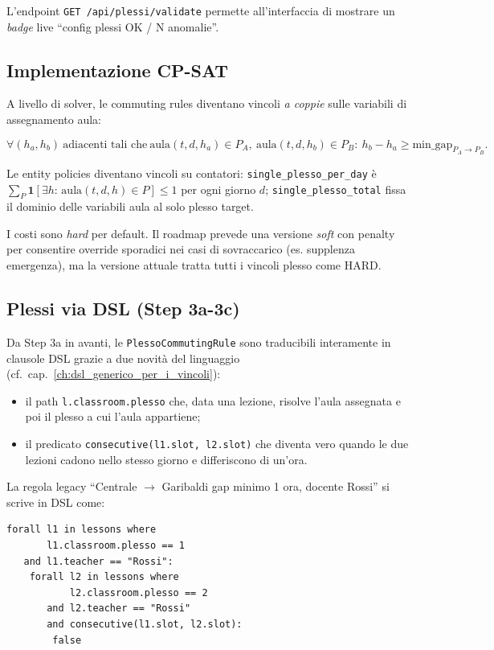 L'endpoint \texttt{GET /api/plessi/validate} permette
all'interfaccia di mostrare un \emph{badge} live ``config
plessi OK / N anomalie''.

\subsection{Implementazione CP-SAT}

A livello di solver, le commuting rules diventano vincoli
\emph{a coppie} sulle variabili di assegnamento aula:

\[
\forall (h_a, h_b)\ \text{adiacenti tali che}\
\text{aula}(t, d, h_a) \in P_A,\
\text{aula}(t, d, h_b) \in P_B:\
h_b - h_a \geq \text{min\_gap}_{P_A \to P_B}.
\]

Le entity policies diventano vincoli su contatori:
\texttt{single\_plesso\_per\_day} \`e
$\sum_{P} \mathbf{1}[\exists h:\,\text{aula}(t,d,h) \in P]
\leq 1$ per ogni giorno $d$;
\texttt{single\_plesso\_total} fissa il dominio delle
variabili aula al solo plesso target.

I costi sono \emph{hard} per default. Il roadmap prevede una
versione \emph{soft} con penalty per consentire override
sporadici nei casi di sovraccarico (es. supplenza
emergenza), ma la versione attuale tratta tutti i vincoli
plesso come HARD.

\subsection{Plessi via DSL (Step 3a-3c)}

Da Step 3a in avanti, le \texttt{PlessoCommutingRule} sono
traducibili interamente in clausole DSL grazie a due novit\`a
del linguaggio (cf.\ cap.~\ref{ch:dsl_generico_per_i_vincoli}):

\begin{itemize}
\item il path \texttt{l.classroom.plesso} che, data una
  lezione, risolve l'aula assegnata e poi il plesso a cui
  l'aula appartiene;
\item il predicato \texttt{consecutive(l1.slot, l2.slot)} che
  diventa vero quando le due lezioni cadono nello stesso
  giorno e differiscono di un'ora.
\end{itemize}

La regola legacy ``Centrale $\to$ Garibaldi gap minimo 1 ora,
docente Rossi'' si scrive in DSL come:

\begin{lstlisting}
forall l1 in lessons where
       l1.classroom.plesso == 1
   and l1.teacher == "Rossi":
    forall l2 in lessons where
           l2.classroom.plesso == 2
       and l2.teacher == "Rossi"
       and consecutive(l1.slot, l2.slot):
        false
\end{lstlisting}

